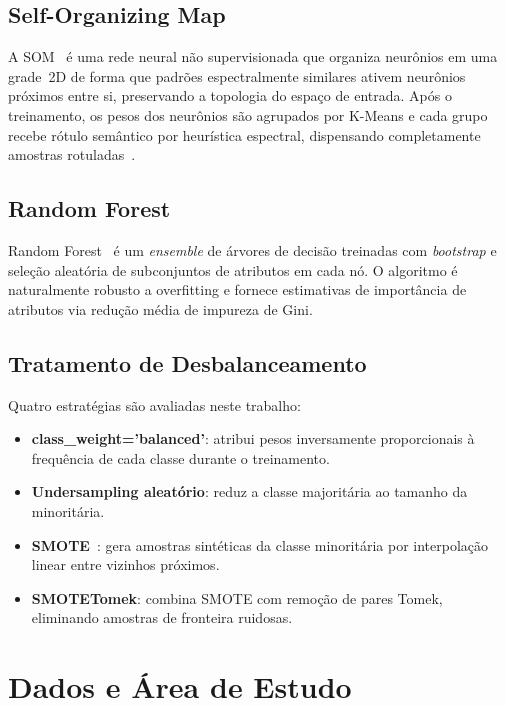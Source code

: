 \documentclass[conference]{IEEEtran}
\begin{document}
\subsection{Self-Organizing Map}

A SOM~\cite{b8} é uma rede neural não supervisionada que organiza
neurônios em uma grade~2D de forma que padrões espectralmente similares
ativem neurônios próximos entre si, preservando a topologia do espaço de
entrada. Após o treinamento, os pesos dos neurônios são agrupados por
K-Means e cada grupo recebe rótulo semântico por heurística espectral,
dispensando completamente amostras rotuladas~\cite{b9}.

\subsection{Random Forest}

Random Forest~\cite{b3} é um \textit{ensemble} de árvores de decisão
treinadas com \textit{bootstrap} e seleção aleatória de subconjuntos de
atributos em cada nó. O algoritmo é naturalmente robusto a overfitting e
fornece estimativas de importância de atributos via redução média de
impureza de Gini.

\subsection{Tratamento de Desbalanceamento}

Quatro estratégias são avaliadas neste trabalho:

\begin{itemize}
  \item \textbf{class\_weight='balanced'}: atribui pesos inversamente
        proporcionais à frequência de cada classe durante o treinamento.
  \item \textbf{Undersampling aleatório}: reduz a classe majoritária ao
        tamanho da minoritária.
  \item \textbf{SMOTE}~\cite{b5}: gera amostras sintéticas da classe
        minoritária por interpolação linear entre vizinhos próximos.
  \item \textbf{SMOTETomek}: combina SMOTE com remoção de pares Tomek,
        eliminando amostras de fronteira ruidosas.
\end{itemize}

\section{Dados e Área de Estudo}
\end{document}

